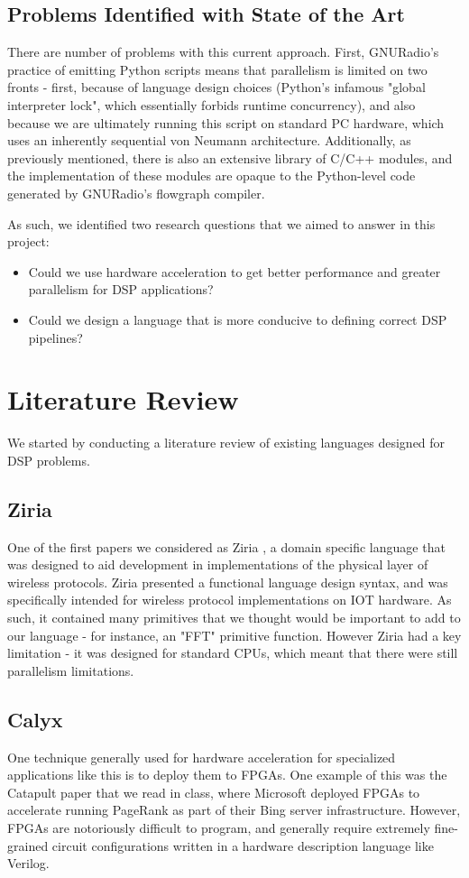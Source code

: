 \documentclass[12pt]{article}
\begin{document}
\subsection{Problems Identified with State of the Art}
There are number of problems with this current approach. First, GNURadio's practice of emitting Python scripts means that parallelism is
limited on two fronts - first, because of language design choices (Python's infamous "global interpreter lock", which essentially forbids
runtime concurrency), and also because we are ultimately running this script on standard PC hardware, which uses an inherently sequential
von Neumann architecture. Additionally, as previously mentioned, there is also an extensive library of C/C++ modules, and the implementation
of these modules are opaque to the Python-level code generated by GNURadio's flowgraph compiler.

As such, we identified two research questions that we aimed to answer in this project:

\begin{itemize}
    \item Could we use hardware acceleration to get better performance and greater parallelism for DSP applications?
    \item Could we design a language that is more conducive to defining correct DSP pipelines?
\end{itemize}

\section{Literature Review}
We started by conducting a literature review of existing languages designed for DSP problems.
\subsection{Ziria}
One of the first papers we considered as Ziria \cite{stewart_ziria_2015}, a domain specific language that was
designed to aid development in implementations of the physical layer of wireless protocols.
Ziria presented a functional language design syntax, and was specifically intended for wireless protocol
implementations on IOT hardware. As such, it contained many primitives that we thought would
be important to add to our language - for instance, an "FFT" primitive function. However Ziria had a key limitation -
it was designed for standard CPUs, which meant that there were still parallelism limitations.

\subsection{Calyx}
One technique generally used for hardware acceleration for specialized applications like this
is to deploy them to FPGAs. One example of this was the Catapult paper that we read in class,
where Microsoft deployed FPGAs to accelerate running PageRank as part of their Bing server infrastructure.
However, FPGAs are notoriously difficult to program, and generally require extremely fine-grained circuit
configurations written in a hardware description language like Verilog.
\end{document}
